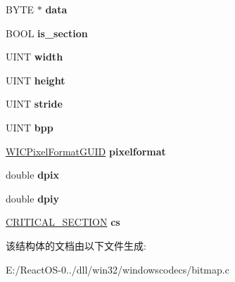 \begin{DoxyCompactItemize}
B\+Y\+TE $\ast$ {\bfseries data}
\item 
\mbox{\label{struct_bitmap_impl_a15bab93564f4f84e4394badf8fdddbb9}} 
B\+O\+OL {\bfseries is\+\_\+section}
\item 
\mbox{\label{struct_bitmap_impl_ae58d76debe2478af673524617afff93e}} 
U\+I\+NT {\bfseries width}
\item 
\mbox{\label{struct_bitmap_impl_a3d3157e7f606e48da5a8e2a3c80d514e}} 
U\+I\+NT {\bfseries height}
\item 
\mbox{\label{struct_bitmap_impl_a177b8176913a9217e8c8eb071ec0e799}} 
U\+I\+NT {\bfseries stride}
\item 
\mbox{\label{struct_bitmap_impl_a68f28d8bd63b310f83e9fd781464ba6b}} 
U\+I\+NT {\bfseries bpp}
\item 
\mbox{\label{struct_bitmap_impl_af99771581156d36c2ecf263863870133}} 
\hyperlink{interface_g_u_i_d}{W\+I\+C\+Pixel\+Format\+G\+U\+ID} {\bfseries pixelformat}
\item 
\mbox{\label{struct_bitmap_impl_aae0491bb815e536b20e416c9c1c8647c}} 
double {\bfseries dpix}
\item 
\mbox{\label{struct_bitmap_impl_a037f58b8fd085ac00f524d5a1e1e64fb}} 
double {\bfseries dpiy}
\item 
\mbox{\label{struct_bitmap_impl_a561ea900163a36978d2c7379cefd9b8c}} 
\hyperlink{struct___c_r_i_t_i_c_a_l___s_e_c_t_i_o_n}{C\+R\+I\+T\+I\+C\+A\+L\+\_\+\+S\+E\+C\+T\+I\+ON} {\bfseries cs}
\end{DoxyCompactItemize}


该结构体的文档由以下文件生成\+:\begin{DoxyCompactItemize}
\item 
E\+:/\+React\+O\+S-\/0../dll/win32/windowscodecs/bitmap.\+c\end{DoxyCompactItemize}
